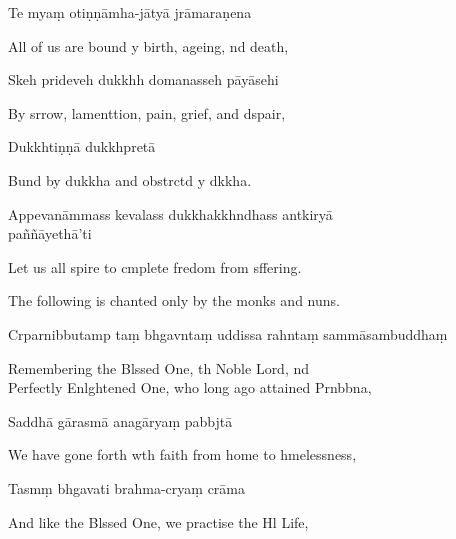 Te myaṃ otiṇṇāmha-jātyā jrāmaraṇena

\begin{english}
  All of us are bound y birth, ageing, nd death,
\end{english}

Skeh prideveh dukkhh domanasseh pāyāsehi

\begin{english}
  By srrow, lamenttion, pain, grief, and dspair,
\end{english}

Dukkhtiṇṇā dukkhpretā

\begin{english}
  Bund by dukkha and obstrctd y dkkha.
\end{english}

Appevanāmmass kevalass dukkhakkhndhass antkiryā \\paññāyethā'ti

\begin{english}
  Let us all spire to cmplete fredom from sffering.
\end{english}

\begin{instruction}
  The following is chanted only by the monks and nuns.
\end{instruction}

Crparnibbutamp taṃ bhgavntaṃ uddissa rahntaṃ sammāsambuddhaṃ

\begin{english}
  Remembering the Blssed One, th Noble Lord, nd \\Perfectly Enlghtened One, who long ago attained Prnbbna,
\end{english}

Saddhā gārasmā anagāryaṃ pabbjtā

\begin{english}
  We have gone forth wth faith from home to hmelessness,
\end{english}

Tasmṃ bhgavati brahma-cryaṃ crāma

\begin{english}
  And like the Blssed One, we practise the Hl Life,
\end{english}


